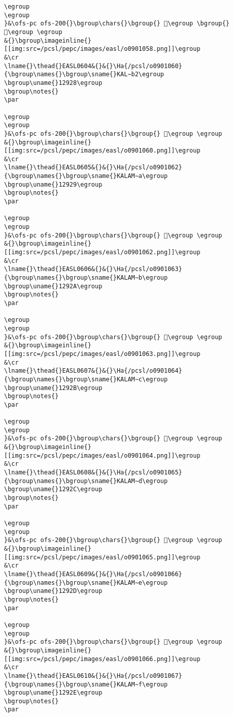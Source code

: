 \begin{verbatim}
\egroup
\egroup
}&\ofs-pc ofs-200{}\bgroup\chars{}\bgroup{} 𒤦\egroup \bgroup{} 𒤧\egroup \egroup
&{}\bgroup\imageinline{}[[img:src=/pcsl/pepc/images/easl/o0901058.png]]\egroup
&\cr
\lname{}\thead{}EASL0604&{}&{}\Ha{/pcsl/o0901060}{\bgroup\names{}\bgroup\sname{}KAL∼b2\egroup
\bgroup\uname{}12928\egroup
\bgroup\notes{}
\par 

\egroup
\egroup
}&\ofs-pc ofs-200{}\bgroup\chars{}\bgroup{} 𒤨\egroup \egroup
&{}\bgroup\imageinline{}[[img:src=/pcsl/pepc/images/easl/o0901060.png]]\egroup
&\cr
\lname{}\thead{}EASL0605&{}&{}\Ha{/pcsl/o0901062}{\bgroup\names{}\bgroup\sname{}KALAM∼a\egroup
\bgroup\uname{}12929\egroup
\bgroup\notes{}
\par 

\egroup
\egroup
}&\ofs-pc ofs-200{}\bgroup\chars{}\bgroup{} 𒤩\egroup \egroup
&{}\bgroup\imageinline{}[[img:src=/pcsl/pepc/images/easl/o0901062.png]]\egroup
&\cr
\lname{}\thead{}EASL0606&{}&{}\Ha{/pcsl/o0901063}{\bgroup\names{}\bgroup\sname{}KALAM∼b\egroup
\bgroup\uname{}1292A\egroup
\bgroup\notes{}
\par 

\egroup
\egroup
}&\ofs-pc ofs-200{}\bgroup\chars{}\bgroup{} 𒤪\egroup \egroup
&{}\bgroup\imageinline{}[[img:src=/pcsl/pepc/images/easl/o0901063.png]]\egroup
&\cr
\lname{}\thead{}EASL0607&{}&{}\Ha{/pcsl/o0901064}{\bgroup\names{}\bgroup\sname{}KALAM∼c\egroup
\bgroup\uname{}1292B\egroup
\bgroup\notes{}
\par 

\egroup
\egroup
}&\ofs-pc ofs-200{}\bgroup\chars{}\bgroup{} 𒤫\egroup \egroup
&{}\bgroup\imageinline{}[[img:src=/pcsl/pepc/images/easl/o0901064.png]]\egroup
&\cr
\lname{}\thead{}EASL0608&{}&{}\Ha{/pcsl/o0901065}{\bgroup\names{}\bgroup\sname{}KALAM∼d\egroup
\bgroup\uname{}1292C\egroup
\bgroup\notes{}
\par 

\egroup
\egroup
}&\ofs-pc ofs-200{}\bgroup\chars{}\bgroup{} 𒤬\egroup \egroup
&{}\bgroup\imageinline{}[[img:src=/pcsl/pepc/images/easl/o0901065.png]]\egroup
&\cr
\lname{}\thead{}EASL0609&{}&{}\Ha{/pcsl/o0901066}{\bgroup\names{}\bgroup\sname{}KALAM∼e\egroup
\bgroup\uname{}1292D\egroup
\bgroup\notes{}
\par 

\egroup
\egroup
}&\ofs-pc ofs-200{}\bgroup\chars{}\bgroup{} 𒤭\egroup \egroup
&{}\bgroup\imageinline{}[[img:src=/pcsl/pepc/images/easl/o0901066.png]]\egroup
&\cr
\lname{}\thead{}EASL0610&{}&{}\Ha{/pcsl/o0901067}{\bgroup\names{}\bgroup\sname{}KALAM∼f\egroup
\bgroup\uname{}1292E\egroup
\bgroup\notes{}
\par 


\end{verbatim}

